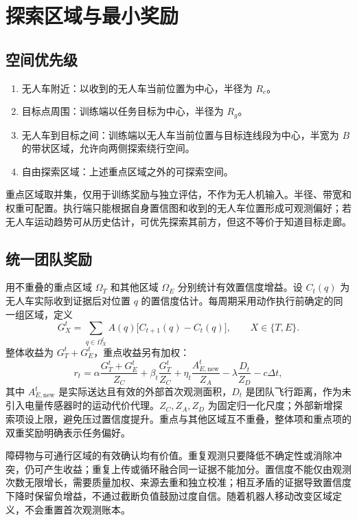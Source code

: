 \documentclass[UTF8,a4paper,11pt,fontset=fandol]{ctexart}
\begin{document}
\section{探索区域与最小奖励}
\subsection{空间优先级}
\begin{enumerate}
  \item 无人车附近：以收到的无人车当前位置为中心，半径为 $R_c$。
  \item 目标点周围：训练端以任务目标为中心，半径为 $R_g$。
  \item 无人车到目标之间：训练端以无人车当前位置与目标连线段为中心，半宽为 $B$ 的带状区域，允许向两侧探索绕行空间。
  \item 自由探索区域：上述重点区域之外的可探索空间。
\end{enumerate}
重点区域取并集，仅用于训练奖励与独立评估，不作为无人机输入。半径、带宽和权重可配置。执行端只能根据自身置信图和收到的无人车位置形成可观测偏好；若无人车运动趋势可从历史估计，可优先探索其前方，但这不等价于知道目标走廊。

\subsection{统一团队奖励}
用不重叠的重点区域 $\Omega_T$ 和其他区域 $\Omega_E$ 分别统计有效置信度增益。设 $C_t(q)$ 为无人车实际收到证据后对位置 $q$ 的置信度估计。每周期采用动作执行前确定的同一组区域，定义
\[
 G_X^t=\sum_{q\in\Omega_X^t} A(q)\bigl[C_{t+1}(q)-C_t(q)\bigr],\qquad X\in\{T,E\}.
\]
整体收益为 $G_T^t+G_E^t$，重点收益另有加权：
\begin{equation}
 r_t=\alpha\frac{G_T^t+G_E^t}{Z_C}
 +\beta_t\frac{G_T^t}{Z_C}
 +\eta_t\frac{A_{E,\mathrm{new}}^t}{Z_A}
 -\lambda\frac{D_t}{Z_D}-c\Delta t,
 \label{eq:reward}
\end{equation}
其中 $A_{E,\mathrm{new}}^t$ 是实际送达且有效的外部首次观测面积，$D_t$ 是团队飞行距离，作为未引入电量传感器时的运动代价代理。$Z_C,Z_A,Z_D$ 为固定归一化尺度；外部新增探索项设上限，避免压过置信度提升。重点与其他区域互不重叠，整体项和重点项的双重奖励明确表示任务偏好。

障碍物与可通行区域的有效确认均有价值。重复观测只要降低不确定性或消除冲突，仍可产生收益；重复上传或循环融合同一证据不能加分。置信度不能仅由观测次数无限增长，需要质量加权、来源去重和独立校准；相互矛盾的证据导致置信度下降时保留负增益，不通过截断负值鼓励过度自信。随着机器人移动改变区域定义，不会重置首次观测账本。
\end{document}
